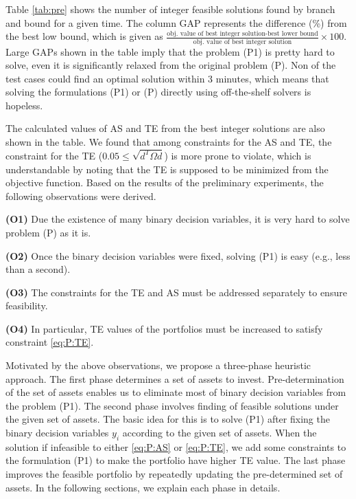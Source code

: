 \documentclass[11pt]{article}
\begin{document}
	Table \ref{tab:pre} shows the number of integer feasible solutions found by branch and bound for a given time. The column GAP represents the difference (\%) from the best low bound, which is given as $\frac{\text{obj. value of best integer solution-best lower bound}}{\text{obj. value of best integer solution}} \times 100$. Large GAPs shown in the table imply that the problem (P1) is pretty hard to solve, even it is significantly relaxed from the original problem (P). Non of the test cases could find an optimal solution within 3 minutes, which means that solving the formulations (P1) or (P) directly using off-the-shelf solvers is hopeless. 
	
	The calculated values of AS and TE from the best integer solutions are also shown in the table. We found that among constraints for the AS and TE, the constraint for the TE ($0.05 \le \sqrt{d^T \Omega d}$) is more prone to violate, which is understandable by noting that the TE is supposed to be minimized from the objective function. Based on the results of the preliminary experiments, the following observations were derived.
	\begin{description}
		\item \textbf{(O1)} Due the existence of many binary decision variables, it is very hard to solve problem (P) as it is.
		\item \textbf{(O2)} Once the binary decision variables were fixed, solving (P1) is easy (e.g., less than a second).
		\item \textbf{(O3)} The constraints for the TE and AS must be addressed separately to ensure feasibility.
		\item \textbf{(O4)} In particular, TE values of the portfolios must be increased to satisfy constraint \eqref{eq:P:TE}.
	\end{description}
	
	Motivated by the above observations, we propose a three-phase heuristic approach. The first phase determines a set of assets to invest. Pre-determination of the set of assets enables us to eliminate most of binary decision variables from the problem (P1). The second phase involves finding of feasible solutions under the given set of assets. The basic idea for this is to solve (P1) after fixing the binary decision variables $y_i$ according to the given set of assets. When the solution if infeasible to either \eqref{eq:P:AS} or \eqref{eq:P:TE}, we add some constraints to the formulation (P1) to make the portfolio have higher TE value. The last phase improves the feasible portfolio by repeatedly updating the pre-determined set of assets. In the following sections, we explain each phase in details.
	
\end{document}

